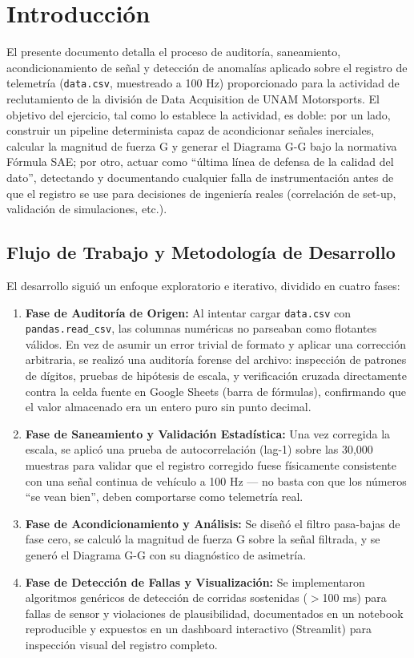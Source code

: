 \documentclass[12pt, letterpaper]{article}
\begin{document}
	\section{Introducción}
	El presente documento detalla el proceso de auditoría, saneamiento, acondicionamiento de señal y detección de anomalías aplicado sobre el registro de telemetría (\texttt{data.csv}, muestreado a 100 Hz) proporcionado para la actividad de reclutamiento de la división de Data Acquisition de UNAM Motorsports. El objetivo del ejercicio, tal como lo establece la actividad, es doble: por un lado, construir un pipeline determinista capaz de acondicionar señales inerciales, calcular la magnitud de fuerza G y generar el Diagrama G-G bajo la normativa Fórmula SAE; por otro, actuar como ``última línea de defensa de la calidad del dato'', detectando y documentando cualquier falla de instrumentación antes de que el registro se use para decisiones de ingeniería reales (correlación de set-up, validación de simulaciones, etc.).
	
	\subsection{Flujo de Trabajo y Metodología de Desarrollo}
	El desarrollo siguió un enfoque exploratorio e iterativo, dividido en cuatro fases:
	\begin{enumerate}
		\item \textbf{Fase de Auditoría de Origen:} Al intentar cargar \texttt{data.csv} con \texttt{pandas.read\_csv}, las columnas numéricas no parseaban como flotantes válidos. En vez de asumir un error trivial de formato y aplicar una corrección arbitraria, se realizó una auditoría forense del archivo: inspección de patrones de dígitos, pruebas de hipótesis de escala, y verificación cruzada directamente contra la celda fuente en Google Sheets (barra de fórmulas), confirmando que el valor almacenado era un entero puro sin punto decimal.
		\item \textbf{Fase de Saneamiento y Validación Estadística:} Una vez corregida la escala, se aplicó una prueba de autocorrelación (lag-1) sobre las 30,000 muestras para validar que el registro corregido fuese físicamente consistente con una señal continua de vehículo a 100 Hz — no basta con que los números ``se vean bien'', deben comportarse como telemetría real.
		\item \textbf{Fase de Acondicionamiento y Análisis:} Se diseñó el filtro pasa-bajas de fase cero, se calculó la magnitud de fuerza G sobre la señal filtrada, y se generó el Diagrama G-G con su diagnóstico de asimetría.
		\item \textbf{Fase de Detección de Fallas y Visualización:} Se implementaron algoritmos genéricos de detección de corridas sostenidas ($>$100 ms) para fallas de sensor y violaciones de plausibilidad, documentados en un notebook reproducible y expuestos en un dashboard interactivo (Streamlit) para inspección visual del registro completo.
	\end{enumerate}
	
\end{document}
